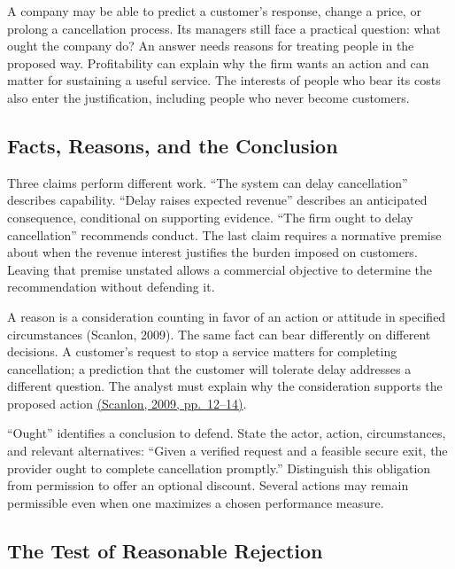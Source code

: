 \noindent \noindent A company may be able to predict a customer's response, change
a price, or prolong a cancellation process. Its managers still face a
practical question: what ought the company do? An answer needs reasons
for treating people in the proposed way. Profitability can explain why
the firm wants an action and can matter for sustaining a useful service.
The interests of people who bear its costs also enter the justification,
including people who never become customers.

\hypertarget{M09-facts-reasons-and-the-conclusion}{%
\subsection{Facts, Reasons, and the
Conclusion}\label{M09-facts-reasons-and-the-conclusion}}

\noindent \noindent Three claims perform different work. ``The system can delay
cancellation'' describes capability. ``Delay raises expected revenue''
describes an anticipated consequence, conditional on supporting
evidence. ``The firm ought to delay cancellation'' recommends conduct.
The last claim requires a normative premise about when the revenue
interest justifies the burden imposed on customers. Leaving that premise
unstated allows a commercial objective to determine the recommendation
without defending it.

A reason is a consideration counting in favor of an action or attitude
in specified circumstances (Scanlon, 2009). The same fact can bear
differently on different decisions. A customer's request to stop a
service matters for completing cancellation; a prediction that the
customer will tolerate delay addresses a different question. The analyst
must explain why the consideration supports the proposed action
\href{https://media.philosophy.ox.ac.uk/assets/pdf_file/0008/25856/Lecture_2.pdf}{(Scanlon,
2009, pp.~12--14)}.

``Ought'' identifies a conclusion to defend. State the actor, action,
circumstances, and relevant alternatives: ``Given a verified request and
a feasible secure exit, the provider ought to complete cancellation
promptly.'' Distinguish this obligation from permission to offer an
optional discount. Several actions may remain permissible even when one
maximizes a chosen performance measure.

\hypertarget{M09-the-test-of-reasonable-rejection}{%
\subsection{The Test of Reasonable
Rejection}\label{M09-the-test-of-reasonable-rejection}}

